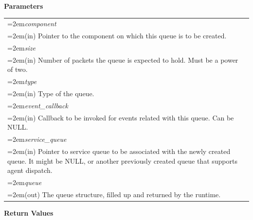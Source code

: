 \documentclass[final]{book}
\newcommand{\hsaarg}[1]{\textit{#1}}
\begin{document}
\noindent\textbf{Parameters}\\[-6mm]
\noindent\begin{longtable}{@{}>{\hangindent=2em}p{\textwidth}}
\hsaarg{component}\\\hspace{2em}(in) Pointer to the component on which this queue is to be created.\\[2mm]
\hsaarg{size}\\\hspace{2em}(in) Number of packets the queue is expected to hold. Must be a power of two.\\[2mm]
\hsaarg{type}\\\hspace{2em}(in) Type of the queue.\\[2mm]
\hsaarg{event_\-callback}\\\hspace{2em}(in) Callback to be invoked for events related with this queue. Can be NULL.\\[2mm]
\hsaarg{service_\-queue}\\\hspace{2em}(in) Pointer to service queue to be associated with the newly created queue. It might be NULL, or another previously created queue that supports agent dispatch.\\[2mm]
\hsaarg{queue}\\\hspace{2em}(out) The queue structure, filled up and returned by the runtime.
\end{longtable}
\vspace{-5mm}\noindent\textbf{Return Values}\\[-6mm]
\end{document}
